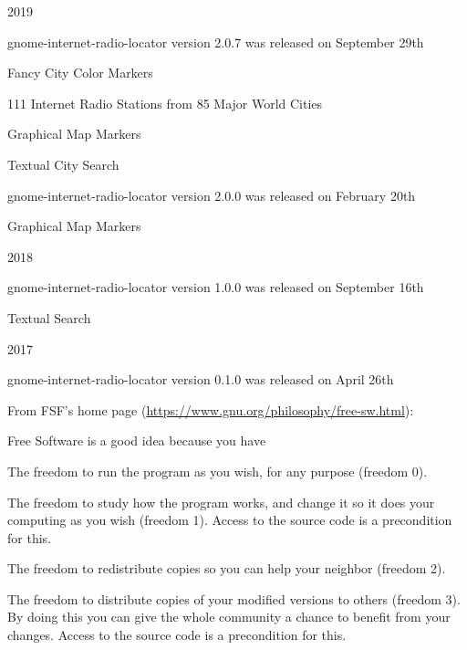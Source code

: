 \documentclass[20pt,landscape]{foils}
\begin{document}
\begin{list1}
\item 2019
  \begin{list2}
  \item gnome-internet-radio-locator version 2.0.7 was released on September 29th
    \begin{list3}
    \item Fancy City Color Markers   
    \item 111 Internet Radio Stations from 85 Major World Cities
    \item Graphical Map Markers
    \item Textual City Search
    \end{list3}
  \end{list2}
  \begin{list3}
    \item gnome-internet-radio-locator version 2.0.0 was released on February 20th
      \begin{list3}
      \item Graphical Map Markers
      \end{list3}
  \end{list3}
\item 2018
  \begin{list2}
    \item gnome-internet-radio-locator version 1.0.0 was released on September 16th
    \begin{list3}
      \item Textual Search
    \end{list3}
  \end{list2}
\item 2017
  \begin{list2}
    \item gnome-internet-radio-locator version 0.1.0 was released on April 26th
  \end{list2}
\end{list1}


From FSF's home page (\url{https://www.gnu.org/philosophy/free-sw.html}):

\begin{list1}
\item Free Software is a good idea because you have
  \begin{list2}
    \item The freedom to run the program as you wish, for any purpose (freedom 0).
    \item The freedom to study how the program works, and change it so it does your computing as you wish (freedom 1). Access to the source code is a precondition for this.
    \item The freedom to redistribute copies so you can help your neighbor (freedom 2).
    \item The freedom to distribute copies of your modified versions to others (freedom 3). By doing this you can give the whole community a chance to benefit from your changes. Access to the source code is a precondition for this.
  \end{list2}
\end{list1}
\end{document}
